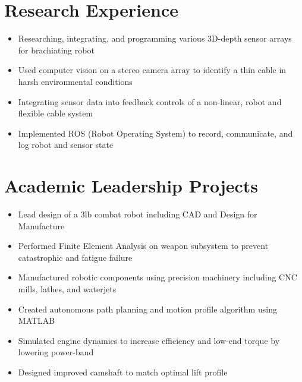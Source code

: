 \documentclass{resume}
\begin{document}
\section{Research Experience}
\begin{itemize}
  \item Researching, integrating, and programming various 3D-depth sensor arrays for brachiating robot
  \item Used computer vision on a stereo camera array to identify a thin cable in harsh environmental conditions
  \item Integrating sensor data into feedback controls of a non-linear, robot and flexible cable system
  \item Implemented ROS (Robot Operating System) to record, communicate, and log robot and sensor state
\end{itemize}

\section{Academic Leadership Projects}
\begin{itemize}
  \item Lead design of a 3lb combat robot including CAD and Design for Manufacture
  \item Performed Finite Element Analysis on weapon subsystem to prevent catastrophic and fatigue failure
  \item Manufactured robotic components using precision machinery including CNC mills, lathes, and waterjets
  \item Created autonomous path planning and motion profile algorithm using MATLAB
\end{itemize}

\begin{itemize}
  \item Simulated engine dynamics to increase efficiency and low-end torque by lowering power-band
  \item Designed improved camshaft to match optimal lift profile
\end{itemize}
\end{document}
